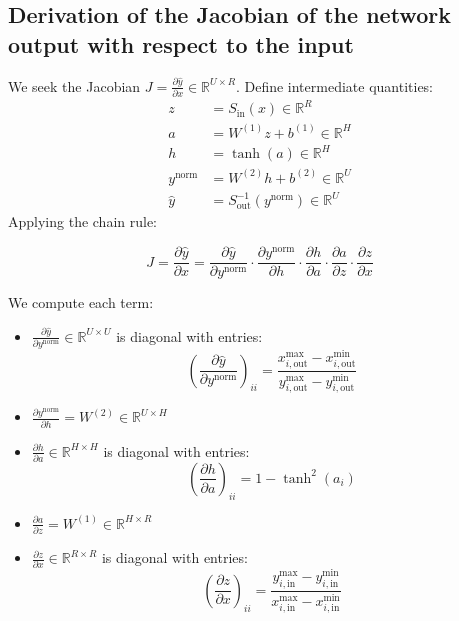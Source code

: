 \documentclass[a4paper,12pt]{article}
\begin{document}
\subsection{Derivation of the Jacobian of the network output with respect to the input}

We seek the Jacobian \( J = \frac{\partial \hat{y}}{\partial x} \in \mathbb{R}^{U \times R} \). Define intermediate quantities:
\begin{align*}
z &= S_{\text{in}}(x) \in \mathbb{R}^R \\
a &= W^{(1)} z + b^{(1)} \in \mathbb{R}^H \\
h &= \tanh(a) \in \mathbb{R}^H \\
y^{\text{norm}} &= W^{(2)} h + b^{(2)} \in \mathbb{R}^U \\
\hat{y} &= S_{\text{out}}^{-1}(y^{\text{norm}}) \in \mathbb{R}^U
\end{align*}
Applying the chain rule:

\[
J = \frac{\partial \hat{y}}{\partial x} 
= \frac{\partial \hat{y}}{\partial y^{\text{norm}}}
  \cdot \frac{\partial y^{\text{norm}}}{\partial h}
  \cdot \frac{\partial h}{\partial a}
  \cdot \frac{\partial a}{\partial z}
  \cdot \frac{\partial z}{\partial x}
\]

We compute each term:

\begin{itemize}
  \item \( \displaystyle \frac{\partial \hat{y}}{\partial y^{\text{norm}}} \in \mathbb{R}^{U \times U} \) is diagonal with entries:
    \[
    \left( \frac{\partial \hat{y}}{\partial y^{\text{norm}}} \right)_{ii} = 
    \frac{x^{\max}_{i,\text{out}} - x^{\min}_{i,\text{out}}}{y^{\max}_{i,\text{out}} - y^{\min}_{i,\text{out}}}
    \]

  \item \( \displaystyle \frac{\partial y^{\text{norm}}}{\partial h} = W^{(2)} \in \mathbb{R}^{U \times H} \)

  \item \( \displaystyle \frac{\partial h}{\partial a} \in \mathbb{R}^{H \times H} \) is diagonal with entries:
    \[
    \left( \frac{\partial h}{\partial a} \right)_{ii} = 1 - \tanh^2(a_i)
    \]

  \item \( \displaystyle \frac{\partial a}{\partial z} = W^{(1)} \in \mathbb{R}^{H \times R} \)

  \item \( \displaystyle \frac{\partial z}{\partial x} \in \mathbb{R}^{R \times R} \) is diagonal with entries:
    \[
    \left( \frac{\partial z}{\partial x} \right)_{ii} = 
    \frac{y^{\max}_{i,\text{in}} - y^{\min}_{i,\text{in}}}{x^{\max}_{i,\text{in}} - x^{\min}_{i,\text{in}}}
    \]
\end{itemize}
\end{document}
